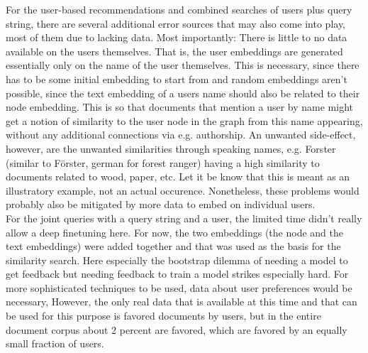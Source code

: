 \documentclass[draft,final]{vutinfth} %
\begin{document}
For the user-based recommendations and combined searches of users plus query string, there are several additional error sources that may also come into play, most of them due to lacking data. Most importantly: There is little to no data available on the users themselves. That is, the user embeddings are generated essentially only on the name of the user themselves. This is necessary, since there has to be some initial embedding to start from and random embeddings aren't possible, since the text embedding of a users name should also be related to their node embedding. This is so that documents that mention a user by name might get a notion of similarity to the user node in the graph from this name appearing, without any additional connections via e.g. authorship. An unwanted side-effect, however, are the unwanted similarities through speaking names, e.g. Forster (similar to Förster, german for forest ranger) having a high similarity to documents related to wood, paper, etc. Let it be know that this is meant as an illustratory example, not an actual occurence. Nonetheless, these problems would probably also be mitigated by more data to embed on individual users. \\
For the joint queries with a query string and a user, the limited time didn't really allow a deep finetuning here. For now, the two embeddings (the node and the text embeddings) were added together and that was used as the basis for the similarity search. Here especially the bootstrap dilemma of needing a model to get feedback but needing feedback to train a model strikes especially hard. For more sophisticated techniques to be used, data about user preferences would be necessary, However, the only real data that is available at this time and that can be used for this purpose is favored documents by users, but in the entire document corpus about 2 percent are favored, which are favored by an equally small fraction of users. 

\end{document}
